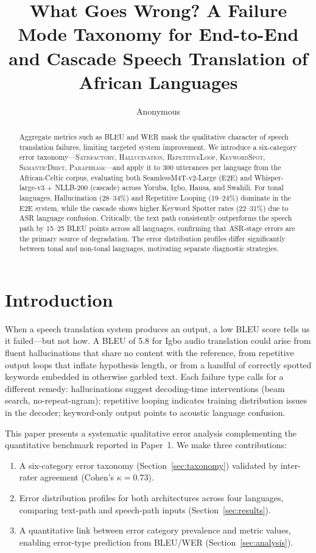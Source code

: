 \documentclass[11pt,a4paper]{article}
\title{What Goes Wrong? A Failure Mode Taxonomy for End-to-End\\
and Cascade Speech Translation of African Languages}
\author{Anonymous}
\date{}
\newcommand{\modelSM}{SeamlessM4T-v2-Large}
\newcommand{\modelWN}{Whisper-large-v3 + NLLB-200}
\newcommand{\catS}{\textsc{Satisfactory}}
\newcommand{\catH}{\textsc{Hallucination}}
\newcommand{\catR}{\textsc{RepetitiveLoop}}
\newcommand{\catK}{\textsc{KeywordSpot}}
\newcommand{\catD}{\textsc{SemanticDrift}}
\newcommand{\catP}{\textsc{Paraphrase}}
\begin{document}
\maketitle

\begin{abstract}
Aggregate metrics such as BLEU and WER mask the qualitative character of speech translation failures, limiting targeted system improvement. We introduce a six-category error taxonomy—\catS{}, \catH{}, \catR{}, \catK{}, \catD{}, \catP{}—and apply it to 300 utterances per language from the African-Celtic corpus, evaluating both \modelSM{} (E2E) and \modelWN{} (cascade) across Yoruba, Igbo, Hausa, and Swahili. For tonal languages, Hallucination (28–34\%) and Repetitive Looping (19–24\%) dominate in the E2E system, while the cascade shows higher Keyword Spotter rates (22–31\%) due to ASR language confusion. Critically, the text path consistently outperforms the speech path by 15–25 BLEU points across all languages, confirming that ASR-stage errors are the primary source of degradation. The error distribution profiles differ significantly between tonal and non-tonal languages, motivating separate diagnostic strategies.
\end{abstract}

\section{Introduction}
\label{sec:intro}

When a speech translation system produces an output, a low BLEU score tells us it failed—but not how. A BLEU of 5.8 for Igbo audio translation could arise from fluent hallucinations that share no content with the reference, from repetitive output loops that inflate hypothesis length, or from a handful of correctly spotted keywords embedded in otherwise garbled text. Each failure type calls for a different remedy: hallucinations suggest decoding-time interventions (beam search, no-repeat-ngram); repetitive looping indicates training distribution issues in the decoder; keyword-only output points to acoustic language confusion.

This paper presents a systematic qualitative error analysis complementing the quantitative benchmark reported in Paper~1. We make three contributions:
\begin{enumerate}
  \item A six-category error taxonomy (Section~\ref{sec:taxonomy}) validated by inter-rater agreement (Cohen's $\kappa = 0.73$).
  \item Error distribution profiles for both architectures across four languages, comparing text-path and speech-path inputs (Section~\ref{sec:results}).
  \item A quantitative link between error category prevalence and metric values, enabling error-type prediction from BLEU/WER (Section~\ref{sec:analysis}).
\end{enumerate}
\end{document}
